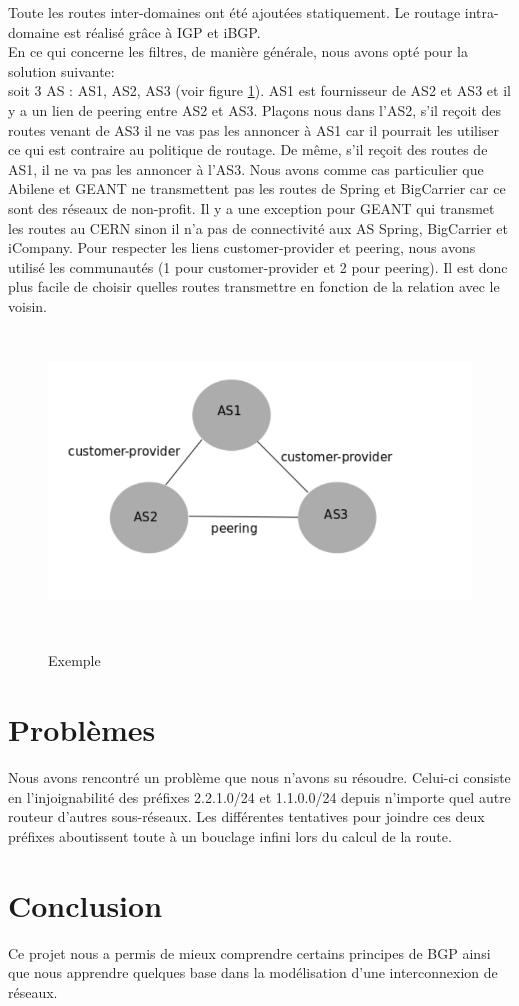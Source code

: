 \documentclass[a4paper,12pt]{report} %
\begin{document}
Toute les routes inter-domaines ont été ajoutées statiquement. Le routage intra-domaine est réalisé grâce à IGP et iBGP.\\

En ce qui concerne les filtres, de manière générale, nous avons opté pour la solution suivante:\\
soit 3 AS : AS1, AS2, AS3 (voir figure \ref{as}). AS1 est fournisseur de AS2 et AS3 et il y a un lien de peering entre AS2 et AS3. Plaçons nous dans l'AS2, s'il reçoit des routes venant de AS3 il ne vas pas les annoncer à AS1 car il pourrait les utiliser ce qui est contraire au politique de routage. De même, s'il reçoit des routes de AS1, il ne va pas les annoncer à l'AS3. Nous avons comme cas particulier que Abilene et GEANT ne transmettent pas les routes de Spring et BigCarrier car ce sont des réseaux de non-profit. Il y a une exception pour GEANT qui transmet les routes au CERN sinon il n'a pas de connectivité aux AS Spring, BigCarrier et iCompany.
Pour respecter les liens customer-provider et peering, nous avons utilisé les communautés (1 pour customer-provider et 2 pour peering). Il est donc plus facile de choisir quelles routes transmettre en fonction de la relation avec le voisin.
\begin{figure}[!h] %
		\centering
		\includegraphics[width=120mm,height=80mm]{as}
		\label{as}
		\caption{Exemple}
	\end{figure} 
	
\section{Problèmes}
Nous avons rencontré un problème que nous n'avons su résoudre. Celui-ci consiste en l'injoignabilité des préfixes 2.2.1.0/24 et 1.1.0.0/24 depuis n'importe quel autre routeur d'autres sous-réseaux. Les différentes tentatives pour joindre ces deux préfixes aboutissent toute à un bouclage infini lors du calcul de la route. 

\section{Conclusion}
Ce projet nous a permis de mieux comprendre certains principes de BGP ainsi que nous apprendre quelques base dans la modélisation d'une interconnexion de réseaux.
\end{document}
